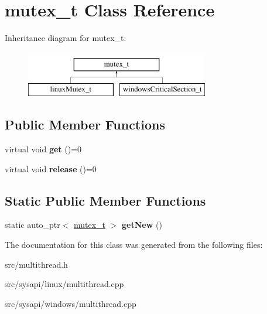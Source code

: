 \hypertarget{classmutex__t}{\section{mutex\-\_\-t \-Class \-Reference}
\label{classmutex__t}
}
\-Inheritance diagram for mutex\-\_\-t\-:\begin{figure}[H]
\begin{center}
\leavevmode
\includegraphics[height=2.000000cm]{classmutex__t}
\end{center}
\end{figure}
\subsection*{\-Public \-Member \-Functions}
\begin{DoxyCompactItemize}
\item 
\hypertarget{classmutex__t_a5d8698f7e2d9a457aacd0acff980eef2}{virtual void {\bfseries get} ()=0}\label{classmutex__t_a5d8698f7e2d9a457aacd0acff980eef2}

\item 
\hypertarget{classmutex__t_a0e8075c40379c5dfc716575f9a1ae213}{virtual void {\bfseries release} ()=0}\label{classmutex__t_a0e8075c40379c5dfc716575f9a1ae213}

\end{DoxyCompactItemize}
\subsection*{\-Static \-Public \-Member \-Functions}
\begin{DoxyCompactItemize}
\item 
\hypertarget{classmutex__t_a004928f63f03787129d180192407247f}{static auto\-\_\-ptr$<$ \hyperlink{classmutex__t}{mutex\-\_\-t} $>$ {\bfseries get\-New} ()}\label{classmutex__t_a004928f63f03787129d180192407247f}

\end{DoxyCompactItemize}


\-The documentation for this class was generated from the following files\-:\begin{DoxyCompactItemize}
\item 
src/multithread.\-h\item 
src/sysapi/linux/multithread.\-cpp\item 
src/sysapi/windows/multithread.\-cpp\end{DoxyCompactItemize}
